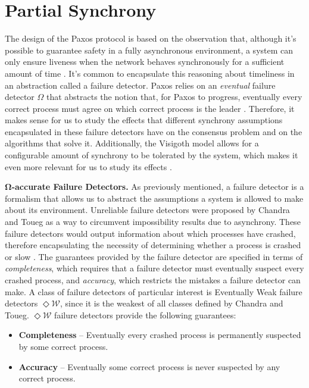 \section{Partial Synchrony} \label{Partial Synchrony}
The design of the Paxos protocol is based on the observation that, although it's possible to guarantee safety in a fully asynchronous environment, a system can only ensure liveness when the network behaves synchronously for a sufficient amount of time \cite{Lamport2001}. It's common to encapsulate this reasoning about timeliness in an abstraction called a failure detector. Paxos relies on an \textit{eventual} failure detector $\Omega$ that abstracts the notion that, for Paxos to progress, eventually every correct process must agree on which correct process is the leader \cite{vukolic2012quorum}. Therefore, it makes sense for us to study the effects that different synchrony assumptions encapsulated in these failure detectors have on the consensus problem and on the algorithms that solve it. Additionally, the Visigoth model allows for a configurable amount of synchrony to be tolerated by the system, which makes it even more relevant for us to study its effects \cite{Porto2015}. \par
\textbf{$\mathbf{\Omega}$-accurate Failure Detectors.} As previously mentioned, a failure detector is a formalism that allows us to abstract the assumptions a system is allowed to make about its environment. Unreliable failure detectors were proposed by Chandra and Toueg as a way to circumvent impossibility results due to asynchrony. These failure detectors would output information about which processes have crashed, therefore encapsulating the necessity of determining whether a process is crashed or slow \cite{DeepakChandra1996}. The guarantees provided by the failure detector are specified in terms of \textit{completeness}, which requires that a failure detector must eventually suspect every crashed process, and \textit{accuracy}, which restricts the mistakes a failure detector can make. A class of failure detectors of particular interest is Eventually Weak failure detectors $\Diamond\mathcal{W}$, since it is the weakest of all classes defined by Chandra and Toueg. $\Diamond\mathcal{W}$ failure detectors provide the following guarantees:
\begin{itemize}
\item \textbf{Completeness} -- Eventually every crashed process is permanently suspected by some correct process.
\item \textbf{Accuracy} --  Eventually some correct process is never suspected by any correct process.
\end{itemize}
